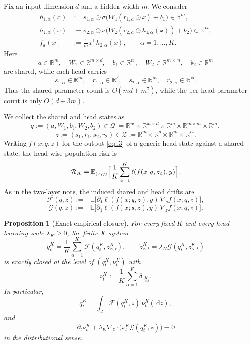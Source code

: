 \documentclass{article}
\newtheorem{proposition}[theorem]{Proposition}
\theoremstyle{definition}
\newcommand{\R}{\mathbb{R}}
\newcommand{\E}{\mathbb{E}}
\newcommand{\dd}{\,\mathrm{d}}
\begin{document}
Fix an input dimension $d$ and a hidden width $m$. We consider
\begin{align}
  h_{1,\alpha}(x)
  &:=
  s_{1,\alpha}\odot
  \sigma\bigl(W_1(r_{1,\alpha}\odot x)+b_1\bigr)
  \in\R^m,
  \label{eq:h1}
  \\
  h_{2,\alpha}(x)
  &:=
  s_{2,\alpha}\odot
  \sigma\bigl(W_2(r_{2,\alpha}\odot h_{1,\alpha}(x))+b_2\bigr)
  \in\R^m,
  \label{eq:h2}
  \\
  f_\alpha(x)
  &:=
  \frac1m a^\top h_{2,\alpha}(x),
  \qquad
  \alpha=1,\dots,K.
  \label{eq:f3}
\end{align}
Here
\[
  a\in\R^m,\quad
  W_1\in\R^{m\times d},\quad
  b_1\in\R^m,\quad
  W_2\in\R^{m\times m},\quad
  b_2\in\R^m
\]
are shared, while each head carries
\[
  s_{1,\alpha}\in\R^m,\quad
  r_{1,\alpha}\in\R^d,\quad
  s_{2,\alpha}\in\R^m,\quad
  r_{2,\alpha}\in\R^m.
\]
Thus the shared parameter count is $O(md+m^2)$, while the per-head parameter count is only $O(d+3m)$.

We collect the shared and head states as
\[
  q:=(a,W_1,b_1,W_2,b_2)\in\mathcal Q
  :=
  \R^m\times\R^{m\times d}\times\R^m\times\R^{m\times m}\times\R^m,
\]
\[
  z:=(s_1,r_1,s_2,r_2)\in\mathcal Z
  :=
  \R^m\times\R^d\times\R^m\times\R^m.
\]
Writing $f(x;q,z)$ for the output \eqref{eq:f3} of a generic head state against a shared state, the head-wise population risk is
\[
  \mathcal R_K
  =
  \E_{(x,y)}
  \Bigl[
    \frac1K\sum_{\alpha=1}^K \ell(f(x;q,z_\alpha),y)
  \Bigr].
\]
As in the two-layer note, the induced shared and head drifts are
\[
  \mathcal F(q,z)
  :=
  -\E
  \bigl[
    \partial_1\ell(f(x;q,z),y)\,\nabla_q f(x;q,z)
  \bigr],
\]
\[
  \mathcal G(q,z)
  :=
  -\E
  \bigl[
    \partial_1\ell(f(x;q,z),y)\,\nabla_z f(x;q,z)
  \bigr].
\]

\begin{proposition}[Exact empirical closure]
\label{prop:3layer-closure}
For every fixed $K$ and every head-learning scale $\lambda_K\ge 0$, the finite-$K$ system
\[
  \dot q_t^K
  =
  \frac1K\sum_{\alpha=1}^K \mathcal F(q_t^K,z_{\alpha,t}^K),
  \qquad
  \dot z_{\alpha,t}^K
  =
  \lambda_K\mathcal G(q_t^K,z_{\alpha,t}^K)
\]
is exactly closed at the level of $(q_t^K,\nu_t^K)$ with
\[
  \nu_t^K:=\frac1K\sum_{\alpha=1}^K \delta_{z_{\alpha,t}^K}.
\]
In particular,
\[
  \dot q_t^K
  =
  \int_{\mathcal Z}\mathcal F(q_t^K,z)\,\nu_t^K(\dd z),
\]
and
\[
  \partial_t\nu_t^K
  +
  \lambda_K\nabla_z\cdot\bigl(\nu_t^K \mathcal G(q_t^K,z)\bigr)
  =
  0
\]
in the distributional sense.
\end{proposition}
\end{document}
